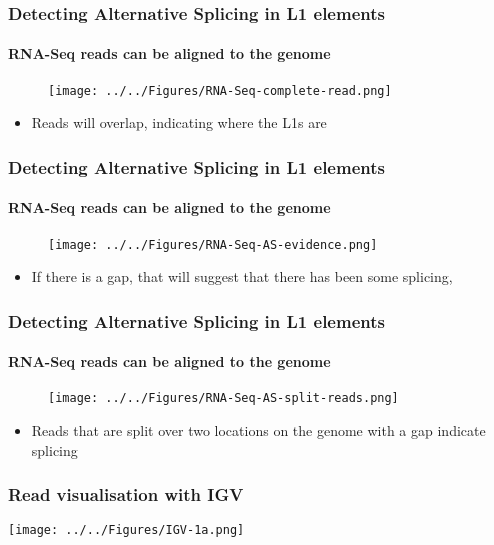 \documentclass{beamer}
\begin{document}
		\begin{frame} %
				\frametitle{Detecting Alternative Splicing in L1 elements}
				\framesubtitle{RNA-Seq reads can be aligned to the genome}
				
				\vfill
				\begin{figure}
					\centering
					\texttt{[image: ../../Figures/RNA-Seq-complete-read.png]}
				\end{figure}
				\vfill
				\begin{itemize}
					\item Reads will overlap, indicating where the L1s are
				\end{itemize}
			\end{frame}
			
		\begin{frame} %
				\frametitle{Detecting Alternative Splicing in L1 elements}
				\framesubtitle{RNA-Seq reads can be aligned to the genome}
				
				\vfill
				\begin{figure}
					\centering
					\texttt{[image: ../../Figures/RNA-Seq-AS-evidence.png]}
				\end{figure}
				\vfill
				\begin{itemize}
					\item If there is a gap, that will suggest that there has been some splicing, 
				\end{itemize}
			\end{frame}
			
			\begin{frame} %
				\frametitle{Detecting Alternative Splicing in L1 elements}
				\framesubtitle{RNA-Seq reads can be aligned to the genome}
				
				\vfill
				\begin{figure}
					\centering
					\texttt{[image: ../../Figures/RNA-Seq-AS-split-reads.png]}
				\end{figure}
				\vfill
				\begin{itemize}
					\item Reads that are split over two locations on the genome with a gap indicate splicing
				\end{itemize}
			\end{frame}
				
		\begin{frame} %
			\frametitle{Read visualisation with IGV} 
			\texttt{[image: ../../Figures/IGV-1a.png]}
		\end{frame}
			
\end{document}
